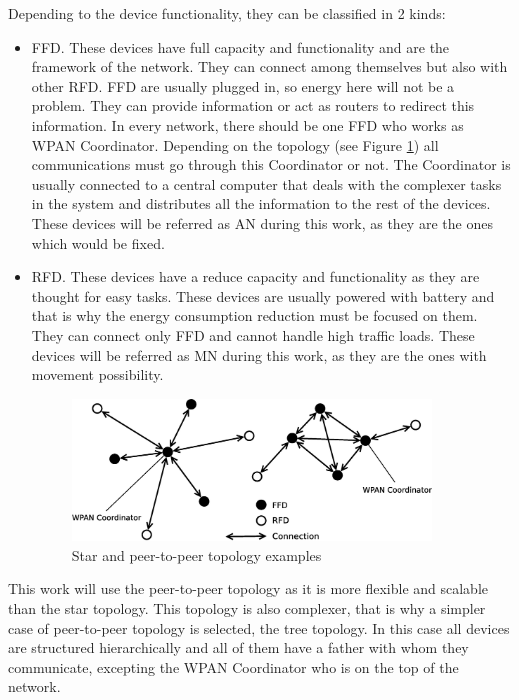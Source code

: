Depending to the device functionality, they can be classified in 2 kinds:

\begin{itemize}
 \item \acl{FFD}. These devices have full capacity and functionality and are the framework of the network. They can connect 
among themselves but also with other \ac{RFD}. \ac{FFD} are usually plugged in, so energy here will not be a problem. They can provide 
information or act as routers to redirect this information. In every network, there should be one \ac{FFD} who works as \ac{WPAN}
Coordinator. Depending on the topology (see Figure \ref{fig:WPAN_Network_Topologies}) all communications must go through this 
Coordinator or not. The Coordinator is usually connected to a central computer that deals with the complexer tasks in the system 
and distributes all the information to the rest of the devices. These devices will be referred as \ac{AN} during this work, as they
are the ones which would be fixed.
 \item \acl{RFD}. These devices have a reduce capacity and functionality as they are thought for easy tasks. These devices are
usually powered with battery and that is why the energy consumption reduction must be focused on them. They can connect only
\ac{FFD} and cannot handle high traffic loads. These devices will be referred as \ac{MN} during this work, as they are the ones with 
movement possibility.

\vspace*{1cm}

\begin{figure}[ht]
 \begin{center}
  \includegraphics[width=0.9\textwidth]{WPAN_Network_Topologies.eps}
 \end{center}
 \caption{Star and peer-to-peer topology examples \cite{IEEE802.15.4-2006}}
 \label{fig:WPAN_Network_Topologies}
\end{figure}
\end{itemize}
This work will use the peer-to-peer topology as it is more flexible and scalable than the star topology. This topology is also
complexer, that is why a simpler case of peer-to-peer topology is selected, the tree topology. In this case all devices are
structured hierarchically and all of them have a father with whom they communicate, excepting the \ac{WPAN} Coordinator who is on the top of the network.

